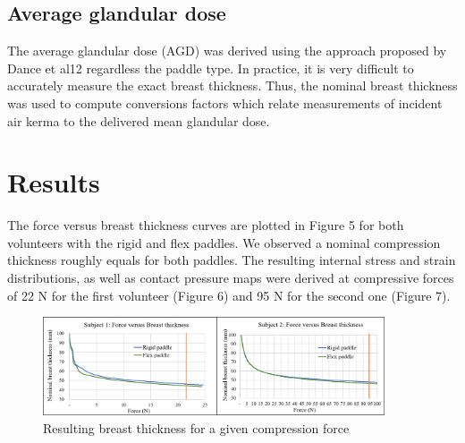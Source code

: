 \subsection{ Average glandular dose}
The average glandular dose (AGD) was derived using the approach proposed by Dance et al12 regardless the paddle type.  In practice, it is very difficult to accurately measure the exact breast thickness. Thus, the nominal breast thickness was used to compute conversions factors which relate measurements of incident air kerma to the delivered mean glandular dose.

\section{Results}\label{section:breastcompressionevaluation}
The force versus breast thickness curves are plotted in Figure 5 for both volunteers with the rigid and flex paddles. We observed a nominal compression thickness roughly equals for both paddles. The resulting internal stress and strain distributions, as well as contact pressure maps were derived at compressive forces of 22 N for the first volunteer (Figure 6) and 95 N for the second one (Figure 7).

\begin{figure}[!h]
\centering
\includegraphics[width=0.9\textwidth,keepaspectratio]{figures/forceThicknessResults.png} 
\caption{Resulting breast thickness for a given compression force}\label{fig:forceThicknessResults}
\end{figure}

